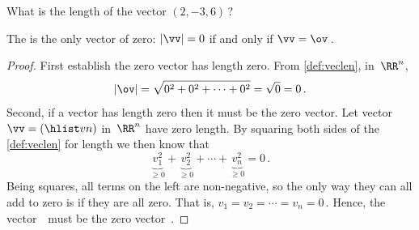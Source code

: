 \begin{activity}
What is the length of the vector \((2,-3,6)\)\,?
\end{activity}




\begin{theorem} \label{thm:veclen0}
The  is the only vector of  zero:
 \(|\vv|=0\) if and only if \(\vv=\ov\)\,.
\end{theorem}

\begin{proof} 
First establish the zero vector has length zero.
From \autoref{def:veclen}, in~\(\RR^n\),
\begin{equation*}
|\ov|=\sqrt{0^2+0^2+\cdots+0^2}=\sqrt{0}=0\,.
\end{equation*}
Second, if a vector has length zero then it must be the zero vector.
Let vector \(\vv=(\hlist vn)\) in~\(\RR^n\) have zero length.
By squaring both sides of the \autoref{def:veclen} for length we then know that
\begin{equation*}
\underbrace{v_1^2}_{\geq0}+\underbrace{v_2^2}_{\geq0}
+\cdots+\underbrace{v_n^2}_{\geq0}=0\,.
\end{equation*}
Being squares, all terms on the left are non-negative, so the only way they can all add to zero is if they are all zero.
That is, \(v_1=v_2=\cdots=v_n=0\)\,.
Hence, the vector~\vv\ must be the zero vector~\ov.
\end{proof}






\sectionExercises


